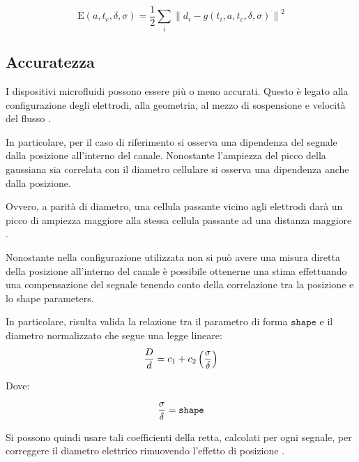 \begin{equation}
	\mathrm{E}(a,t_c,\delta,\sigma) = \frac{1}{2} \sum_{i}\left\|d_{i}-g\left(t_{i},a,t_c,\delta,\sigma\right)\right\|^{2}
\end{equation}


\subsection{Accuratezza}


I dispositivi microfluidi possono essere più o meno accurati. Questo è legato alla configurazione degli elettrodi, alla geometria, al mezzo di sospensione e velocità del flusso \cite{sun_single-cell_2010}.

In particolare, per il caso di riferimento si osserva una dipendenza del segnale dalla posizione all'interno del canale. Nonostante l'ampiezza del picco della gaussiana sia correlata con il diametro cellulare si osserva una dipendenza anche dalla posizione.

Ovvero, a parità di diametro, una cellula passante vicino agli elettrodi darà un picco di ampiezza maggiore alla stessa cellula passante ad una distanza maggiore \cite{spencer_high_2016}.

Nonostante nella configurazione utilizzata non si può avere una misura diretta della posizione all'interno del canale è possibile ottenerne una stima effettuando una compensazione del segnale tenendo conto della correlazione tra la posizione e lo shape parameters.

In particolare, risulta valida la relazione tra il parametro di forma $\mathtt{shape}$ e il diametro normalizzato che segue una legge lineare:
\begin{equation}
	{D\over d}={c_1+c_2\left(\sigma \over \delta \right)}
	\label{eq:compensazione}
\end{equation}

Dove:

\begin{equation}
	{\sigma \over \delta} = \mathtt{shape}
\end{equation}

Si possono quindi usare tali coefficienti della retta, calcolati per ogni segnale, per correggere il diametro elettrico rimuovendo l'effetto di posizione \cite{errico_mitigating_2017}.



